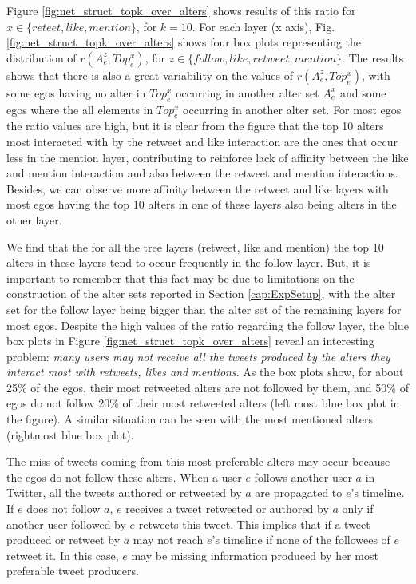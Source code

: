 Figure \ref{fig:net_struct_topk_over_alters} shows results of this ratio for $x \in\{reteet, like, mention \}$, for $k=10$. For each layer (x axis), Fig. \ref{fig:net_struct_topk_over_alters} shows four box plots representing the distribution of $r(A_e ^z,Top_e^x)$, for $z \in\{follow,like, retweet, mention\}$. The results shows that there is also a great variability on the values of $r(A_e ^z,Top_e^x)$, with some egos having no alter in $Top_e^x$ occurring in another alter set $A_e^x$ and some egos where the all elements in $Top_e^x$ occurring in another alter set. For most egos the ratio values are high, but it is clear from the figure that the top 10 alters most interacted with by the retweet and like interaction are the ones that occur less in the mention layer, contributing to reinforce lack of affinity between the like and mention interaction and also between the retweet and mention interactions. Besides, we can observe more affinity between the retweet and like layers with most egos having the top 10 alters in one of these layers also being alters in the other layer. 

We find that the for all the tree layers (retweet, like and mention) the top 10 alters in these layers tend to occur frequently in the follow layer. But, it is important to remember that this fact may be due to limitations on the construction of the alter sets reported in Section \ref{cap:ExpSetup}, with the alter set for the follow layer being bigger than the alter set of the remaining layers for most egos. Despite the high values of the ratio regarding the follow layer, the blue box plots in Figure \ref{fig:net_struct_topk_over_alters} reveal an interesting problem: {\em many users may not receive all the tweets produced by the alters they interact most with retweets, likes and mentions}. As the box plots show, for about 25\% of the egos, their most retweeted alters are not followed by them, and 50\% of egos do not follow 20\% of their most retweeted alters (left most blue box plot in the figure). A similar situation can be seen with the most mentioned alters (rightmost blue box plot).

The miss of tweets coming from this most preferable alters may occur because the egos do not follow these alters. When a user $e$ follows another user $a$ in Twitter, all the tweets authored or retweeted by $a$ are propagated to $e$’s  timeline. If $e$ does not follow $a$, $e$ receives a tweet retweeted or authored by $a$ only if another user followed by $e$ retweets this tweet. This implies that if a tweet produced or retweet by $a$ may not reach $e$’s timeline if none of the followees of $e$ retweet it. In this case, $e$ may be missing information produced by her most preferable tweet producers. 

